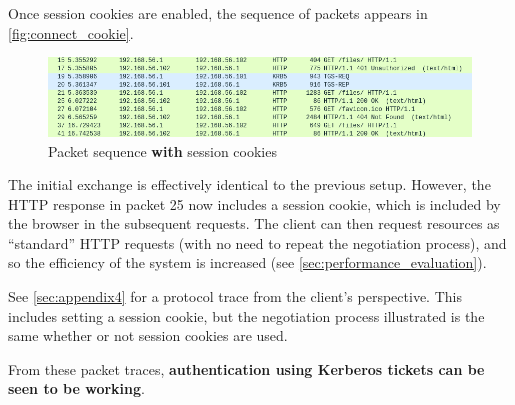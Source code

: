 \documentclass[12pt]{report}
\begin{document}
Once session cookies are enabled, the sequence of packets appears in \autoref{fig:connect_cookie}.

\begin{figure}[ht]
  \begin{center}
    \includegraphics[width=\textwidth]{10-connect-cookie.png}
  \end{center}
  \caption{Packet sequence \textbf{with} session cookies}
  \label{fig:connect_cookie}
\end{figure}

The initial exchange is effectively identical to the previous setup. However, the HTTP response in packet 25 now includes a session cookie, which is included by the browser in the subsequent requests. The client can then request resources as ``standard'' HTTP requests (with no need to repeat the negotiation process), and so the efficiency of the system is increased (see \autoref{sec:performance_evaluation}).

See \autoref{sec:appendix4} for a protocol trace from the client's perspective. This includes setting a session cookie, but the negotiation process illustrated is the same whether or not session cookies are used.

From these packet traces, \textbf{authentication using Kerberos tickets can be seen to be working}.
\end{document}
